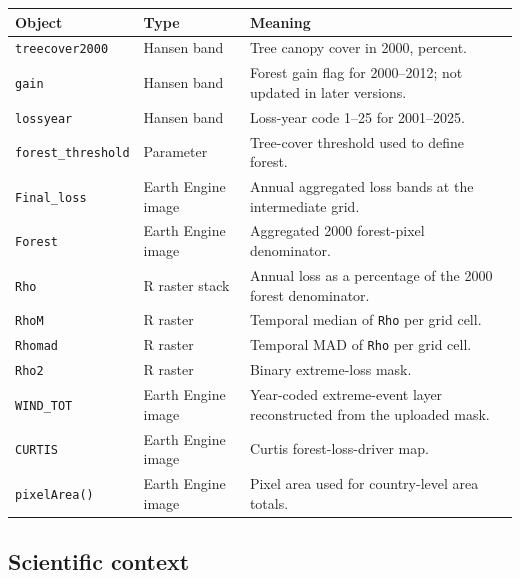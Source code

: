 \documentclass[
]{article}
\begin{document}
\begin{longtable}[]{@{}
  >{\raggedright\arraybackslash}p{}
  >{\raggedright\arraybackslash}p{}
  >{\raggedright\arraybackslash}p{}@{}}
\toprule\noalign{}
\begin{minipage}[b]{\linewidth}\raggedright
Object
\end{minipage} & \begin{minipage}[b]{\linewidth}\raggedright
Type
\end{minipage} & \begin{minipage}[b]{\linewidth}\raggedright
Meaning
\end{minipage} \\
\midrule\noalign{}
\endhead
\bottomrule\noalign{}
\endlastfoot
\texttt{treecover2000} & Hansen band & Tree canopy cover in 2000,
percent. \\
\texttt{gain} & Hansen band & Forest gain flag for 2000--2012; not
updated in later versions. \\
\texttt{lossyear} & Hansen band & Loss-year code 1--25 for
2001--2025. \\
\texttt{forest\_threshold} & Parameter & Tree-cover threshold used to
define forest. \\
\texttt{Final\_loss} & Earth Engine image & Annual aggregated loss bands
at the intermediate grid. \\
\texttt{Forest} & Earth Engine image & Aggregated 2000 forest-pixel
denominator. \\
\texttt{Rho} & R raster stack & Annual loss as a percentage of the 2000
forest denominator. \\
\texttt{RhoM} & R raster & Temporal median of \texttt{Rho} per grid
cell. \\
\texttt{Rhomad} & R raster & Temporal MAD of \texttt{Rho} per grid
cell. \\
\texttt{Rho2} & R raster & Binary extreme-loss mask. \\
\texttt{WIND\_TOT} & Earth Engine image & Year-coded extreme-event layer
reconstructed from the uploaded mask. \\
\texttt{CURTIS} & Earth Engine image & Curtis forest-loss-driver map. \\
\texttt{pixelArea()} & Earth Engine image & Pixel area used for
country-level area totals. \\
\end{longtable}

\subsection{Scientific context}\label{scientific-context}
\end{document}
